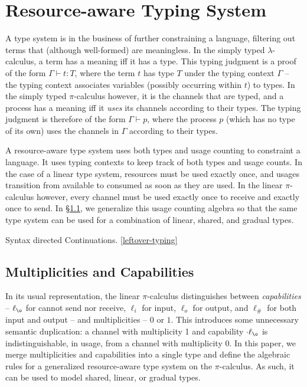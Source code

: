 \documentclass[a4paper,UKenglish,cleveref, autoref, thm-restate,authorcolumns]{lipics-v2019}
\newcommand{\lamcalc}{$\lambda$-calculus}
\newcommand{\picalc}{$\pi$-calculus}
\begin{document}
\section{Resource-aware Typing System}

A type system is in the business of further constraining a language, filtering out terms that (although well-formed) are meaningless.
In the simply typed \lamcalc{}, a term has a meaning iff it has a type.
This typing judgment is a proof of the form $\Gamma \vdash t : T$, where the term $t$ has type $T$ under the typing context $\Gamma$ -- the typing context associates variables (possibly occurring within $t$) to types.
In the simply typed \picalc{} however, it is the channels that are typed, and a process has a meaning iff it \emph{uses} its channels according to their types.
The typing judgment is therefore of the form $\Gamma \vdash p$, where the process $p$ (which has no type of its own) uses the channels in $\Gamma$ according to their types.

A resource-aware type system uses both types and usage counting to constraint a language.
It uses typing contexts to keep track of both types and usage counts.
In the case of a linear type system, resources must be used exactly once, and usages transition from available to consumed as soon as they are used.
In the linear \picalc{} however, every channel must be used exactly once to receive and exactly once to send.
In \S \ref{multiplicities}, we generalize this usage counting algebra so that the same type system can be used for a combination of linear, shared, and gradual types.


Syntax directed
Continuations.
\ref{leftover-typing}

\subsection{Multiplicities and Capabilities}\label{multiplicities}

In its usual representation, the linear \picalc{} distinguishes between \emph{capabilities} -- $\ell_{\o}$ for cannot send nor receive, $\ell_i$ for input, $\ell_o$ for output, and $\ell_\#$ for both input and output -- and multiplicities -- $0$ or $1$.
This introduces some unnecessary semantic duplication: a channel with multiplicity 1 and capability $\cdot \ell_{\o}$ is indistinguishable, in usage, from a channel with multiplicity 0.
In this paper, we merge multiplicities and capabilities into a single type and define the algebraic rules for a generalized resource-aware type system on the \picalc{}.
As such, it can be used to model shared, linear, or gradual types.
  
\end{document}
